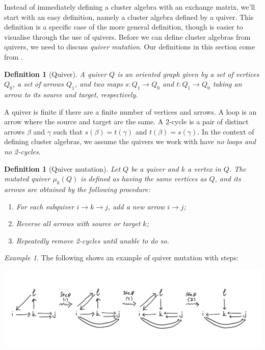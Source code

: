 \documentclass[12pt]{amsart}
\newtheorem{definition}[theorem]{Definition}
\theoremstyle{remark}
\theoremstyle{remark}
\newtheorem*{example}{Example}
\begin{document}
Instead of immediately defining a cluster algebra with an exchange matrix, we'll start with an easy definition, namely a cluster algebra defined by a quiver.
This definition is a specific case of the more general definition, though is easier to visualise through the use of quivers.
Before we can define cluster algebras from quivers, we need to discuss \emph{quiver mutation}.
Our definitions in this section come from \cite[\S 2.1]{Williams14}.

\begin{definition}[Quiver]
A quiver $Q$ is an oriented graph given by a set of vertices $Q_0$, a set of arrows $Q_1$, and two maps $s : Q_1 \to Q_0$ and $t : Q_1 \to Q_0$ taking an arrow to its source and target, respectively.
\end{definition}

A quiver is finite if there are a finite number of vertices and arrows.
A loop is an arrow where the source and target are the same.
A 2-cycle is a pair of distinct arrows $\beta$ and $\gamma$ such that $s(\beta) = t(\gamma)$ and $t(\beta) = s(\gamma)$.
In the context of defining cluster algebras, we assume the quivers we work with have \emph{no loops and no 2-cycles}.

\begin{definition}[Quiver mutation]
Let $Q$ be a quiver and $k$ a vertex in $Q$.
The mutated quiver $\mu_k(Q)$ is defined as having the same vertices as $Q$, and its arrows are obtained by the following procedure:
\begin{enumerate}
\item
For each subquiver $i \to k \to j$, add a new arrow $i \to j$;

\item
Reverse all arrows with source or target $k$;

\item
Repeatedly remove 2-cycles until unable to do so.
\end{enumerate}
\end{definition}

\begin{example}
The following shows an example of quiver mutation with steps:

\includegraphics[width=\textwidth]{quiver_mutation}

\end{example}
\end{document}
